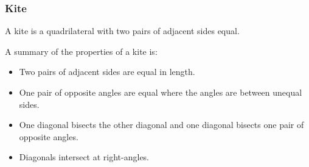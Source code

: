 \subsubsection{ Kite}
A kite is a quadrilateral with two pairs of adjacent sides equal.\par 
A summary of the properties of a kite is:\par 
\begin{itemize}[noitemsep]
\item Two pairs of adjacent sides are equal in length.
\item One pair of opposite angles are equal where the angles are between unequal
sides.
\item One diagonal bisects the other diagonal and one diagonal bisects one pair
of opposite angles.
\item Diagonals intersect at right-angles.
\end{itemize}
\setcounter{subfigure}{0}
